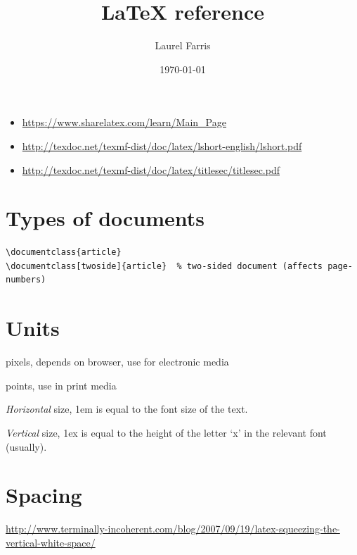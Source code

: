 \documentclass{article}
\title{LaTeX reference}
\author{Laurel Farris}
\date{\today}
\begin{document}
\maketitle
\begin{itemize}
    \item \url{https://www.sharelatex.com/learn/Main_Page}
    \item \url{http://texdoc.net/texmf-dist/doc/latex/lshort-english/lshort.pdf}
    \item \url{http://texdoc.net/texmf-dist/doc/latex/titlesec/titlesec.pdf}
\end{itemize}
\tableofcontents\newpage

\section{Types of documents}
\begin{verbatim}
\documentclass{article}
\documentclass[twoside]{article}  % two-sided document (affects page-numbers)
\end{verbatim}

\section{Units}
\begin{description}[itemsep=-1ex]
    \item [px] pixels, depends on browser, use for electronic media
    \item [pt] points, use in print media
    \item [em] \emph{Horizontal} size, 1em is equal to the font size of
        the text.
    \item [ex] \emph{Vertical} size, 1ex is equal to the height of the
        letter `x' in the relevant font (usually).
\end{description}

\section{Spacing}
\url{http://www.terminally-incoherent.com/blog/2007/09/19/latex-squeezing-the-vertical-white-space/}
\end{document}
